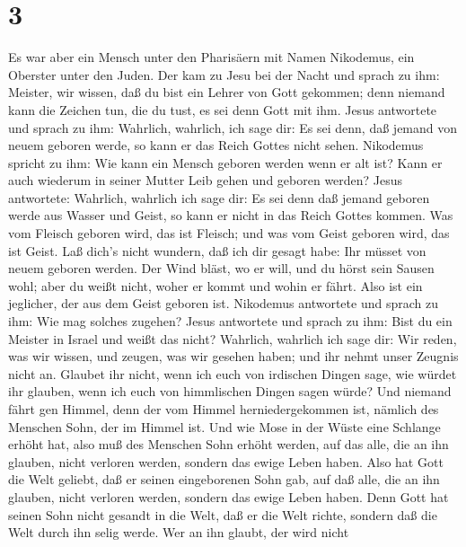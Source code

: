 \hypertarget{section-2}{%
\section{3}\label{section-2}}

 Es war aber ein Mensch unter den Pharisäern mit Namen
Nikodemus, ein Oberster unter den Juden.  Der kam zu Jesu
bei der Nacht und sprach zu ihm: Meister, wir wissen, daß du bist ein
Lehrer von Gott gekommen; denn niemand kann die Zeichen tun, die du
tust, es sei denn Gott mit ihm.  Jesus antwortete und sprach
zu ihm: Wahrlich, wahrlich, ich sage dir: Es sei denn, daß jemand von
neuem geboren werde, so kann er das Reich Gottes nicht sehen.
 Nikodemus spricht zu ihm: Wie kann ein Mensch geboren
werden wenn er alt ist? Kann er auch wiederum in seiner Mutter Leib
gehen und geboren werden?  Jesus antwortete: Wahrlich,
wahrlich ich sage dir: Es sei denn daß jemand geboren werde aus Wasser
und Geist, so kann er nicht in das Reich Gottes kommen.  Was
vom Fleisch geboren wird, das ist Fleisch; und was vom Geist geboren
wird, das ist Geist.  Laß dich's nicht wundern, daß ich dir
gesagt habe: Ihr müsset von neuem geboren werden.  Der Wind
bläst, wo er will, und du hörst sein Sausen wohl; aber du weißt nicht,
woher er kommt und wohin er fährt. Also ist ein jeglicher, der aus dem
Geist geboren ist.  Nikodemus antwortete und sprach zu ihm:
Wie mag solches zugehen?  Jesus antwortete und sprach zu
ihm: Bist du ein Meister in Israel und weißt das nicht? 
Wahrlich, wahrlich ich sage dir: Wir reden, was wir wissen, und zeugen,
was wir gesehen haben; und ihr nehmt unser Zeugnis nicht an.
 Glaubet ihr nicht, wenn ich euch von irdischen Dingen
sage, wie würdet ihr glauben, wenn ich euch von himmlischen Dingen sagen
würde?  Und niemand fährt gen Himmel, denn der vom Himmel
herniedergekommen ist, nämlich des Menschen Sohn, der im Himmel ist.
 Und wie Mose in der Wüste eine Schlange erhöht hat, also
muß des Menschen Sohn erhöht werden,  auf das alle, die an
ihn glauben, nicht verloren werden, sondern das ewige Leben haben.
 Also hat Gott die Welt geliebt, daß er seinen eingeborenen
Sohn gab, auf daß alle, die an ihn glauben, nicht verloren werden,
sondern das ewige Leben haben.  Denn Gott hat seinen Sohn
nicht gesandt in die Welt, daß er die Welt richte, sondern daß die Welt
durch ihn selig werde.  Wer an ihn glaubt, der wird nicht
